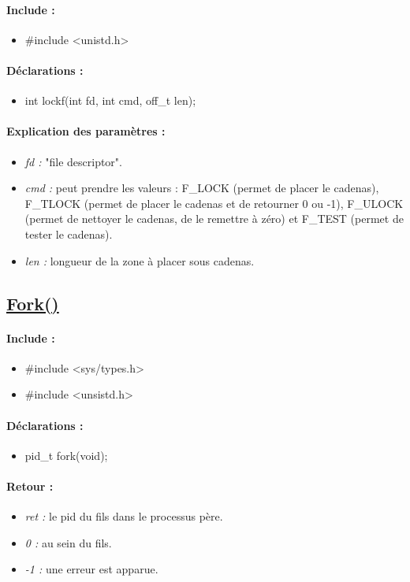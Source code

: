 \documentclass{article}[12pt]
\begin{document}
\paragraph{Include : }
\begin{itemize}
	\item \#include <unistd.h>
\end{itemize}
\paragraph{Déclarations : }
\begin{itemize}
	\item int lockf(int fd, int cmd, off\_t len);
\end{itemize}
\paragraph{Explication des paramètres : }
\begin{itemize}
	\item \emph{fd : } "file descriptor".
	\item \emph{cmd : } peut prendre les valeurs : F\_LOCK (permet de placer le cadenas), F\_TLOCK (permet de placer le cadenas et de retourner 0 ou -1), F\_ULOCK (permet de nettoyer le cadenas, de le remettre à zéro) et F\_TEST (permet de tester le cadenas).
	\item \emph{len :} longueur de la zone à placer sous cadenas.
\end{itemize}
\subsection{\href{http://jp.barralis.com/linux-man/man2/fork.2.php}{Fork()}}
\paragraph{Include : }
\begin{itemize}
	\item \#include <sys/types.h>
    \item \#include <unsistd.h>
\end{itemize}
\paragraph{Déclarations : }
\begin{itemize}
	\item pid\_t fork(void);
\end{itemize}
\paragraph{Retour : }
\begin{itemize}
	\item \emph{ret : } le pid du fils dans le processus père.
	\item \emph{0 : } au sein du fils.
	\item \emph{-1 : } une erreur est apparue.
\end{itemize}
\end{document}

